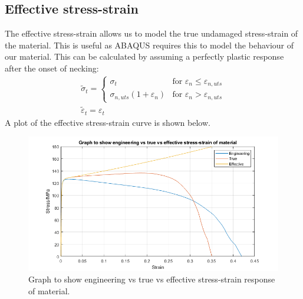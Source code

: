 \documentclass[11pt]{article}
\numberwithin{equation}{section}
\begin{document}
\subsection{Effective stress-strain}
The effective stress-strain allows us to model the true undamaged stress-strain of the material. This is useful as ABAQUS requires this to model the behaviour of our material. This can be calculated by assuming a perfectly plastic response after the onset of necking:
\begin{gather}
    \widetilde{\sigma}_t = \begin{cases}
        \sigma_t & \textrm{for } \varepsilon_n \leq \varepsilon_{n,uts}\\
        \sigma_{n,uts}\left(1 + \varepsilon_n\right) & \textrm{for } \varepsilon_n > \varepsilon_{n,uts}
    \end{cases}\\
    \widetilde{\varepsilon}_t = \varepsilon_t
\end{gather}
A plot of the effective stress-strain curve is shown below.
\begin{figure}[H]
    \centering
    \includegraphics[width = \textwidth]{./img/engVsTrueVsEffectiveStressStrain.png}
    \caption{Graph to show engineering vs true vs effective stress-strain response of material.}
    \label{engVsTrueVsEffectiveStressStrainCurve}
\end{figure}
\end{document}
